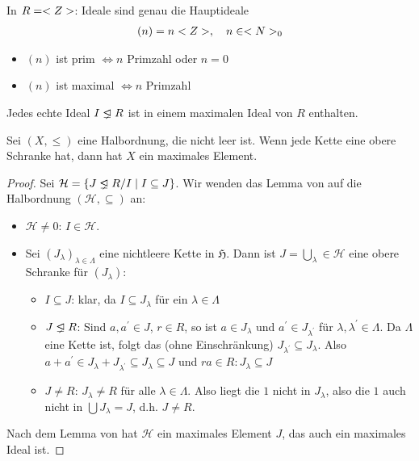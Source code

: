 \begin{example}
	In $R = <Z>$: Ideale sind genau die Hauptideale
	\begin{align}
		(n) = n<Z>,\quad n \in <N>_0\notag
	\end{align}
	\begin{itemize}
		\item $(n)$ ist prim $\Leftrightarrow n$ Primzahl oder $n = 0$
		\item $(n)$ ist maximal $\Leftrightarrow n$ Primzahl
	\end{itemize}
\end{example}

\begin{proposition}
	Jedes echte Ideal $I \properideal R$ ist in einem maximalen Ideal von $R$ enthalten.
\end{proposition}

\begin{erinnerung}
	Sei $(X,\le)$ eine Halbordnung, die nicht leer ist. Wenn jede Kette eine obere Schranke hat, dann hat $X$ ein maximales Element.
\end{erinnerung}

\begin{proof}
	Sei $\mathcal{H} = \{ J \properideal R / I \mid I \subseteq J\}$. Wir wenden das Lemma von  auf die Halbordnung $(\mathcal{H},\subseteq)$ an:
	\begin{itemize}
		\item $\mathcal{H} \neq 0$: $I \in \mathcal{H}$.
		\item Sei $(J_{\lambda})_{\lambda \in \Lambda}$ eine nichtleere Kette in $\mathfrak{H}$. Dann ist $J = \bigcup_{\lambda} \in \mathcal{H}$ eine obere Schranke für $(J_{\lambda})$:
		\begin{itemize}
			\item $I \subseteq J$: klar, da $I \subseteq J_{\lambda}$ für ein $\lambda \in \Lambda$
			\item $J \properideal R$: Sind $a,a^{'} \in J$, $r \in R$, so ist $a \in J_{\lambda}$ und $a^{'} \in J_{\lambda^{'}}$ für $\lambda, \lambda^{'} \in \Lambda$. Da $\Lambda$ eine Kette ist, folgt das (ohne Einschränkung) $J_{\lambda^{'}} \subseteq J_{\lambda}$. Also $a+a^{'} \in J_{\lambda} + J_{\lambda^{'}} \subseteq J_{\lambda} \subseteq J$ und $ra \in R: J_{\lambda} \subseteq J$
			\item $J \neq R$: $J_{\lambda} \neq R$ für alle $\lambda \in \Lambda$. Also liegt die $1$ nicht in $J_{\lambda}$, also die $1$ auch nicht in $\bigcup J_{\lambda} = J$, d.h. $J \neq R.$
		\end{itemize}
	\end{itemize}
	Nach dem Lemma von  hat $\mathcal{H}$ ein maximales Element $J$, das auch ein maximales Ideal ist.
\end{proof}

